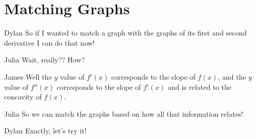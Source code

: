\documentclass{ximera}
\begin{document}
\section{Matching Graphs}
\begin{dialogue}
\item[Dylan]So if I wanted to match a graph with the graphs of its first and second derivative I can do that now!
\item[Julia] Wait, really?? How?
\item[James] Well the $y$ value of $f'(x)$ corresponds to the slope of $f(x)$, and the $y$ value of $f''(x)$ corresponds to the slope of $f'(x)$ and is related to the concavity of $f(x)$.
\item[Julia] So we can match the graphs based on how all that information relates!
\item[Dylan] Exactly, let's try it!
\end{dialogue}
\end{document}
